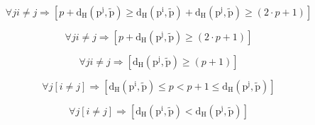 \documentclass[
]{article}
\begin{document}
\begin{enumerate}
\begin{enumerate}
\begin{enumerate}
\begin{enumerate}
        \[\forall j{i \neq j}\Rightarrow\left\lbrack {{p + \mathtt{\mathrm{d_{H}}}}{\left( {\mathtt{\mathrm{p^{j}}},\mathtt{\mathrm{\widetilde{p}}}} \right) \geq \mathtt{\mathrm{d_{H}}}}{\left( {\mathtt{\mathrm{p^{i}}},\mathtt{\mathrm{\widetilde{p}}}} \right) + \mathtt{\mathrm{d_{H}}}}{\left( {\mathtt{\mathrm{p^{j}}},\mathtt{\mathrm{\widetilde{p}}}} \right) \geq \left( {{2 \cdot p} + 1} \right)}} \right\rbrack\]

        \[\forall j{i \neq j}\Rightarrow\left\lbrack {{p + \mathtt{\mathrm{d_{H}}}}{\left( {\mathtt{\mathrm{p^{j}}},\mathtt{\mathrm{\widetilde{p}}}} \right) \geq \left( {{2 \cdot p} + 1} \right)}} \right\rbrack\]

        \[\forall j{i \neq j}\Rightarrow\left\lbrack {\mathtt{\mathrm{d_{H}}}{\left( {\mathtt{\mathrm{p^{j}}},\mathtt{\mathrm{\widetilde{p}}}} \right) \geq \left( {p + 1} \right)}} \right\rbrack\]

        \[\forall j\left\lbrack {i \neq j} \right\rbrack\Rightarrow\left\lbrack {\mathtt{\mathrm{d_{H}}}{{{\left( {\mathtt{\mathrm{p^{i}}},\mathtt{\mathrm{\widetilde{p}}}} \right) \leq p} < {p + 1}} \leq \mathtt{\mathrm{d_{H}}}}\left( {\mathtt{\mathrm{p^{j}}},\mathtt{\mathrm{\widetilde{p}}}} \right)} \right\rbrack\]

        \[\forall j\left\lbrack {i \neq j} \right\rbrack\Rightarrow\left\lbrack {\mathtt{\mathrm{d_{H}}}{\left( {\mathtt{\mathrm{p^{i}}},\mathtt{\mathrm{\widetilde{p}}}} \right) < \mathtt{\mathrm{d_{H}}}}\left( {\mathtt{\mathrm{p^{j}}},\mathtt{\mathrm{\widetilde{p}}}} \right)} \right\rbrack\]


\end{enumerate}
\end{enumerate}
\end{enumerate}
\end{enumerate}
\end{document}
